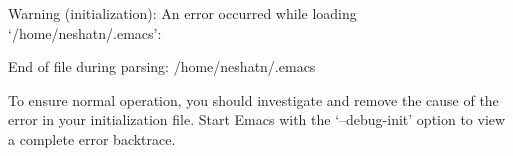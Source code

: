 Warning (initialization): An error occurred while loading `/home/neshatn/.emacs':

End of file during parsing: /home/neshatn/.emacs

To ensure normal operation, you should investigate and remove the
cause of the error in your initialization file.  Start Emacs with
the `--debug-init' option to view a complete error backtrace.
